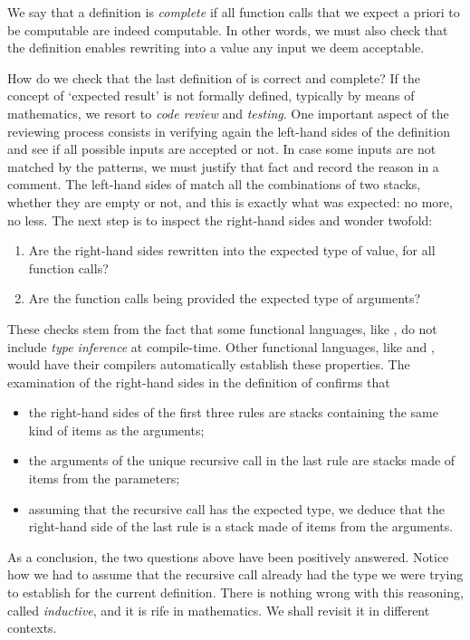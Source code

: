 We say that a definition is \emph{complete} if all function calls that
we expect a priori to be computable are indeed computable. In other
words, we must also check that the definition enables rewriting into a
value any input we deem acceptable.

How do we check that the last definition of  is
correct and complete? If the concept of `expected result' is not
formally defined, typically by means of mathematics, we resort to
\emph{code review} and \emph{testing}. One important aspect of the
reviewing process consists in verifying again the left\hyp{}hand sides
of the definition and see if all possible inputs are accepted or
not. In case some inputs are not matched by the patterns, we must
justify that fact and record the reason in a comment. The
left\hyp{}hand sides of  match all the combinations of two
stacks, whether they are empty or not, and this is exactly what was
expected: no more, no less. The next step is to inspect the
right\hyp{}hand sides and wonder twofold:
\begin{enumerate}

  \item Are the right\hyp{}hand sides rewritten into the expected type
    of value, for all function calls?

  \item Are the function calls being provided the expected type of
    arguments?

\end{enumerate}
These checks stem from the fact that some functional languages, like
\Erlang, do not include \emph{type inference} at
compile\hyp{}time. Other functional languages, like \OCaml and
\Haskell, would have their compilers automatically establish these
properties. The examination of the right\hyp{}hand sides in the
definition of  confirms that
\begin{itemize}

\item the right\hyp{}hand sides of the first three rules are stacks
  containing the same kind of items as the arguments;

\item the arguments of the unique recursive call in the last rule
  are stacks made of items from the parameters;

\item assuming that the recursive call has the expected type, we
  deduce that the right\hyp{}hand side of the last rule is a stack
  made of items from the arguments.

\end{itemize}
As a conclusion, the two questions above have been positively
answered. Notice how we had to assume that the recursive call already
had the type we were trying to establish for the current
definition. There is nothing wrong with this reasoning, called
\emph{inductive}, and it is rife in mathematics. We shall revisit it
in different contexts.

